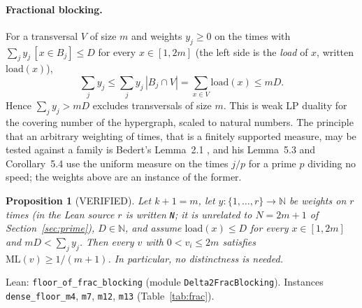 \documentclass[11pt]{article}
\newtheorem{proposition}[theorem]{Proposition}
\theoremstyle{remark}
\newcommand{\ML}{\mathrm{ML}}
\begin{document}
\paragraph{Fractional blocking.} For a transversal $V$ of size $m$ and weights $y_j\ge0$ on the times with $\sum_{j}y_j\,[x\in B_j]\le D$ for every $x\in[1,2m]$ (the left side is the \emph{load} of $x$, written $\mathrm{load}(x)$),
\[
\sum_j y_j\le\sum_j y_j\,|B_j\cap V|=\sum_{x\in V}\mathrm{load}(x)\le mD .
\]
Hence $\sum_jy_j>mD$ excludes transversals of size $m$. This is weak LP duality for the covering number of the hypergraph, scaled to natural numbers. The principle that an arbitrary weighting of times, that is a finitely supported measure, may be tested against a family is Bedert's Lemma~2.1 \cite{Bed25}, and his Lemma~5.3 and Corollary~5.4 use the uniform measure on the times $j/p$ for a prime $p$ dividing no speed; the weights above are an instance of the former.

\begin{proposition}[VERIFIED]\label{prop:frac}
Let $k+1=m$, let $y:\{1,\dots,r\}\to\mathbb N$ be weights on $r$ times (in the Lean source $r$ is written \texttt{N}; it is unrelated to $N=2m+1$ of Section~\ref{sec:prime}), $D\in\mathbb N$, and assume $\mathrm{load}(x)\le D$ for every $x\in[1,2m]$ and $mD<\sum_jy_j$. Then every $v$ with $0<v_i\le 2m$ satisfies $\ML(v)\ge1/(m+1)$. In particular, no distinctness is needed.
\end{proposition}
\noindent Lean: \texttt{floor\_of\_frac\_blocking} (module \texttt{Delta2FracBlocking}). Instances \texttt{dense\_floor\_m4}, \texttt{m7}, \texttt{m12}, \texttt{m13} (Table~\ref{tab:frac}).
\end{document}
